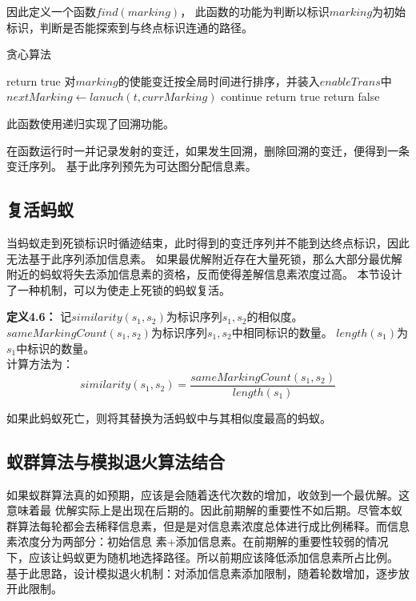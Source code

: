 因此定义一个函数$find(marking)$，
此函数的功能为判断以标识$marking$为初始标识，判断是否能探索到与终点标识连通的路径。
\begin{algorithm}[H]
	\caption{贪心算法}
	\label{alg4-12}
	\begin{algorithmic}
				\State return true
			\EndIf
			\State 对$marking$的使能变迁按全局时间进行排序，并装入$enableTrans$中
				\State $nextMarking \leftarrow lanuch(t,currMarking)$
					\State continue
				\EndIf
					\State return true
				\EndIf
			\EndFor
			\State return false
		\EndProcedure
	\end{algorithmic}
\end{algorithm}
此函数使用递归实现了回溯功能。

在函数运行时一并记录发射的变迁，如果发生回溯，删除回溯的变迁，便得到一条变迁序列。
基于此序列预先为可达图分配信息素。

\subsection{复活蚂蚁}
当蚂蚁走到死锁标识时循迹结束，此时得到的变迁序列并不能到达终点标识，因此无法基于此序列添加信息素。
如果最优解附近存在大量死锁，那么大部分最优解附近的蚂蚁将失去添加信息素的资格，反而使得差解信息素浓度过高。
本节设计了一种机制，可以为使走上死锁的蚂蚁复活。

\textbf{定义4.6}\textbf{：}
记$similarity(s_{1},s_{2})$为标识序列$s_{1},s_{2}$的相似度。\\
$sameMarkingCount(s_{1},s_{2})$为标识序列$s_{1},s_{2}$中相同标识的数量。
$length(s_{1})$为$s_{1}$中标识的数量。\\
计算方法为：
$$
	similarity(s_{1},s_{2})=\frac{sameMarkingCount(s_{1},s_{2})}{length(s_{1})} 
$$

如果此蚂蚁死亡，则将其替换为活蚂蚁中与其相似度最高的蚂蚁。
\subsection{蚁群算法与模拟退火算法结合}
如果蚁群算法真的如预期，应该是会随着迭代次数的增加，收敛到一个最优解。这意味着最
优解实际上是出现在后期的。因此前期解的重要性不如后期。尽管本蚁群算法每轮都会去稀释信息素，但是是对信息素浓度总体进行成比例稀释。而信息素浓度分为两部分：初始信息
素+添加信息素。在前期解的重要性较弱的情况下，应该让蚂蚁更为随机地选择路径。所以前期应该降低添加信息素所占比例。
基于此思路，设计模拟退火机制：对添加信息素添加限制，随着轮数增加，逐步放开此限制。

